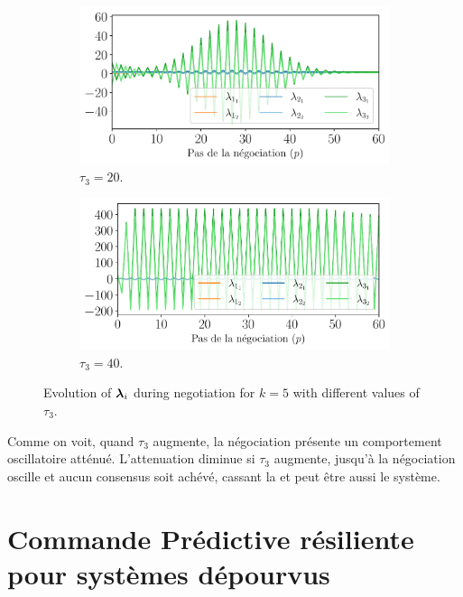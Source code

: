 \documentclass[../main.tex]{subfiles}
\begin{document}
\begin{figure}[h]
\begin{subfigure}{0.45\textwidth}
    \includegraphics[width=\textwidth]{../img/example_primal_decomposition/example_vary_tau_lambda_tau_20.0_fr.pdf}
    \caption{$\tau_{3}=20$.}\label{fig:example_vary_tau_lambda_tau_20}
  \end{subfigure}
  \begin{subfigure}{0.45\textwidth}
    \includegraphics[width=\textwidth]{../img/example_primal_decomposition/example_vary_tau_lambda_tau_40.0_fr.pdf}
    \caption{$\tau_{3}=40$.}\label{fig:example_vary_tau_lambda_tau_40}
  \end{subfigure}
    \caption{Evolution of $\boldsymbol{\lambda}_{i}$ during negotiation for $k=5$ with different values of $\tau_{3}$.}\label{fig:example_vary_tau_lambda_fr}
\end{figure}
Comme on voit, quand $\tau_{3}$ augmente, la négociation présente un comportement oscillatoire atténué.
L'attenuation diminue si $\tau_{3}$ augmente, jusqu'à la négociation oscille et aucun consensus soit achévé, cassant la \dmpc{} et peut être aussi le système.

\newpage
\section{Commande Prédictive résiliente pour systèmes dépourvus}\label{sec:comm-pred-resil}
\end{document}
